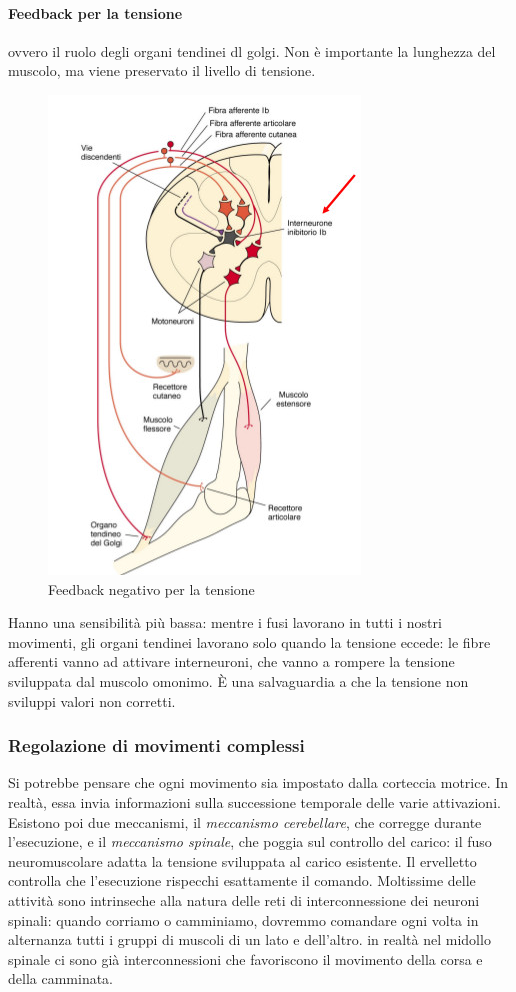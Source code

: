 \documentclass[a4paper,12pt]{article}
\begin{document}
\paragraph{Feedback per la tensione} ovvero il ruolo degli organi tendinei dl golgi. Non è importante la lunghezza del muscolo, ma viene preservato il livello di tensione.
\begin{figure}[H]
\centering
\includegraphics[scale=0.4]{immagine/feed_tensione.jpg}
\caption{Feedback negativo per la tensione}
\end{figure}

 Hanno una sensibilità più bassa: mentre i fusi lavorano in tutti i nostri movimenti, gli organi tendinei lavorano solo quando la tensione eccede: le fibre afferenti vanno ad attivare interneuroni, che vanno a rompere la tensione sviluppata dal muscolo omonimo. È una salvaguardia a che la tensione non sviluppi valori non corretti. 

\subsubsection{Regolazione di movimenti complessi}
Si potrebbe pensare che ogni movimento sia impostato dalla corteccia motrice. In realtà, essa invia informazioni sulla successione temporale delle varie attivazioni. Esistono poi due meccanismi, il \emph{meccanismo cerebellare}, che corregge durante l'esecuzione,  e il \emph{meccanismo spinale}, che poggia sul controllo del carico: il fuso neuromuscolare adatta la tensione sviluppata al carico esistente. Il ervelletto controlla che l'esecuzione rispecchi esattamente il comando. Moltissime delle attività sono intrinseche alla natura delle reti di interconnessione dei neuroni spinali: quando corriamo o camminiamo, dovremmo comandare ogni volta in alternanza tutti i gruppi di muscoli di un lato e dell'altro. in realtà nel midollo spinale ci sono già interconnessioni che favoriscono il movimento della corsa e della camminata. 
\end{document}
